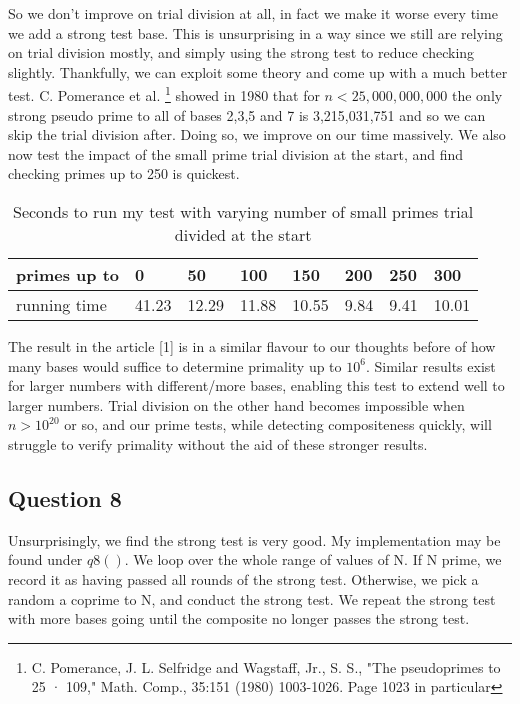 \documentclass[10pt,a4paper]{report}
\begin{document}
So we don't improve on trial division at all, in fact we make it worse every time we add a strong test base. This is unsurprising in a way since we still are relying on trial division mostly, and simply using the strong test to reduce checking slightly. Thankfully, we can exploit some theory and come up with a much better test. C. Pomerance et al. \footnote{C. Pomerance, J. L. Selfridge and Wagstaff, Jr., S. S., "The pseudoprimes to 25 · 109," Math. Comp., 35:151 (1980) 1003-1026. Page 1023 in particular} showed  in 1980 that for $n < 25,000,000,000$ the only strong pseudo prime to all of bases 2,3,5 and 7 is  3,215,031,751 and so we can skip the trial division after. Doing so, we improve on our time massively. We also now test the impact of the small prime trial division at the start, and find checking primes up to 250 is quickest.\\

\begin{table}[h]
\centering
\begin{tabular}{|l|l|l|l|l|l|l|l|}
\hline
primes up to & 0     & 50    & 100   & 150   & 200  & 250  & 300   \\ \hline
running time & 41.23 & 12.29 & 11.88 & 10.55 & 9.84 & 9.41 & 10.01 \\ \hline
\end{tabular}
\caption{Seconds to run my test with varying number of small primes trial divided at the start}
\end{table}

The result in the article [1] is in a similar flavour to our thoughts before of how many bases would suffice to determine primality up to $10^6$. Similar results exist for larger numbers with different/more bases, enabling this test to extend well to larger numbers. Trial division on the other hand becomes impossible when $n>10^{20}$ or so, and our prime tests, while detecting compositeness quickly, will struggle to verify primality without the aid of these stronger results.\\




\subsection*{Question 8}
Unsurprisingly, we find the strong test is very good. My implementation may be found under $q8()$. We loop over the whole range of values of N. If N prime, we record it as having passed all rounds of the strong test. Otherwise, we pick a random a coprime to N, and conduct the strong test. We repeat the strong test with more bases going until the composite no longer passes the strong test.\\
\end{document}
